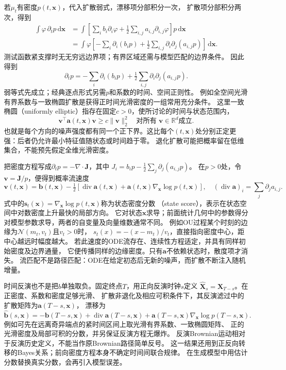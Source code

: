 若$\mu_t$有密度$p(t,\bm x)$，代入扩散弱式，漂移项分部积分一次，
扩散项分部积分两次，得到
\begin{align*}
 \int\varphi\,\partial_t p\,\mathrm d\bm x
  &=\int\left[\sum_i b_i\partial_i\varphi
            +\tfrac12\sum_{i,j}a_{i,j}\partial_{i,j}\varphi\right]p\,\mathrm d\bm x\\
  &=\int\varphi\left[-\sum_i\partial_i(b_ip)
           +\tfrac12\sum_{i,j}\partial_i\partial_j(a_{i,j}p)\right]\,\mathrm d\bm x .
\end{align*}
测试函数紧支撑时无无穷远边界项；有界区域还需与模型匹配的边界条件。
因此得到
\begin{equation}
 \partial_t p=-\sum_i\partial_i(b_ip)
                  +\tfrac12\sum_{i,j}\partial_i\partial_j(a_{i,j}p).
 \label{eq:dynamical-fokker-planck}
\end{equation}
弱等式先成立；经典逐点形式另需$p$和系数的时间、空间正则性。
例如全空间光滑有界系数与一致椭圆扩散是获得正时间光滑密度的一组常用充分条件。
这里一致椭圆（uniformly elliptic）指存在固定$c>0$，使所讨论的时间与状态范围内，
\[
 \bm v^\top\bm a(t,\bm x)\bm v\geq c\|\bm v\|_2^2
 \quad\text{对所有 }\bm v\in\mathbb R^d\text{成立}.
\]
也就是每个方向的噪声强度都有同一个正下界。这比每个$(t,\bm x)$处分别正定更强：后者仍允许最小特征值随状态或时间趋于零。
退化扩散可能把概率留在低维集合，不能预先假定全维光滑密度。

把密度方程写成$\partial_t p=-\nabla\cdot\bm J$，其中
$J_i=b_ip-\frac12\sum_j\partial_j(a_{i,j}p)$。
在$p>0$处，令$\bm v=\bm J/p$，便得到概率流速度
\begin{equation}
 \bm v(t,\bm x)=\bm b(t,\bm x)
   -\tfrac12[\operatorname{div}\bm a(t,\bm x)
                         +\bm a(t,\bm x)\nabla_{\bm x}\log p(t,\bm x)],
 \quad
 (\operatorname{div}\bm a)_i=\sum_j\partial_j a_{i,j}.
 \label{eq:action-state-probability-flow}
\end{equation}
式中的$\bm s_t(\bm x)=\nabla_{\bm x}\log p(t,\bm x)$称为状态密度分数
（state score），表示在状态空间中对数密度上升最快的局部方向。
它对状态$\bm x$求导；前面统计几何中的参数得分对模型参数求导，两者的自变量及向量维数通常不同。
例如OU过程某个时刻的边缘为$\mathcal N(m_t,v_t)$且$v_t>0$时，
$s_t(x)=-(x-m_t)/v_t$，直接指向密度中心，距中心越远时幅度越大。
若此速度的ODE流存在、连续性方程适定，并具有同样初始密度及边界通量，
它便传播同样的边缘密度。只有$\bm a$不依赖状态时，散度项才消失。
流匹配不是路径匹配：ODE在给定初态后无新的噪声，而扩散不断注入随机增量。

时间反演也不是把$b$单独取负。固定终点$T$，用正向反演时钟$s$定义
$\widehat{\bm X}_s=\bm X_{T-s}$。在正密度、系数和密度足够光滑、
扩散非退化及相应可积条件下，其反演滤过中的扩散矩阵为$\bm a(T-s,\bm x)$，
漂移为
\[
 \widehat{\bm b}(s,\bm x)
    =-\bm b(T-s,\bm x)+\operatorname{div}\bm a(T-s,\bm x)
                  +\bm a(T-s,\bm x)\nabla_{\bm x}\log p(T-s,\bm x).
\]
例如可先在远离奇异端点的紧时间区间上取光滑有界系数、一致椭圆矩阵、
正的光滑密度及局部可积的分数，并另保证反演方程无爆炸。
反演Brownian运动相对于反演历史定义，不能当作原Brownian路径简单反号。
这一结果还用到正反向转移的Bayes关系；前向密度方程本身不确定时间间联合规律。
在生成模型中用估计分数替换真实分数，会再引入模型误差。

